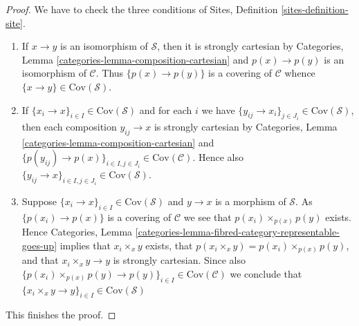\documentclass{stacks-project}
\theoremstyle{plain}
\theoremstyle{definition}
\theoremstyle{remark}
\numberwithin{equation}{subsection}
\begin{document}
\begin{proof}
We have to check the three conditions of
Sites, Definition \ref{sites-definition-site}.
\begin{enumerate}
\item If $x \to y$ is an isomorphism of $\mathcal{S}$, then
it is strongly cartesian by
Categories, Lemma \ref{categories-lemma-composition-cartesian}
and $p(x) \to p(y)$ is an isomorphism of $\mathcal{C}$. Thus
$\{p(x) \to p(y)\}$ is a covering of $\mathcal{C}$ whence
$\{x \to y\} \in \text{Cov}(\mathcal{S})$.
\item If $\{x_i \to x\}_{i\in I} \in \text{Cov}(\mathcal{S})$ and for each
$i$ we have $\{y_{ij} \to x_i\}_{j\in J_i} \in \text{Cov}(\mathcal{S})$, then
each composition $y_{ij} \to x$ is strongly cartesian by
Categories, Lemma \ref{categories-lemma-composition-cartesian}
and $\{p(y_{ij}) \to p(x)\}_{i \in I, j\in J_i} \in \text{Cov}(\mathcal{C})$.
Hence also $\{y_{ij} \to x\}_{i \in I, j\in J_i} \in \text{Cov}(\mathcal{S})$.
\item Suppose $\{x_i \to x\}_{i\in I}\in \text{Cov}(\mathcal{S})$
and $y \to x$ is a morphism of $\mathcal{S}$. As $\{p(x_i) \to p(x)\}$
is a covering of $\mathcal{C}$ we see that $p(x_i) \times_{p(x)} p(y)$
exists. Hence
Categories, Lemma \ref{categories-lemma-fibred-category-representable-goes-up}
implies that $x_i \times_x y$ exists, that $p(x_i \times_x y) =
p(x_i) \times_{p(x)} p(y)$, and that $x_i \times_x y \to y$ is
strongly cartesian. Since also
$\{p(x_i) \times_{p(x)} p(y) \to p(y) \}_{i\in I} \in \text{Cov}(\mathcal{C})$
we conclude that
$\{x_i \times_x y \to y \}_{i\in I} \in \text{Cov}(\mathcal{S})$
\end{enumerate}
This finishes the proof.
\end{proof}
\end{document}
